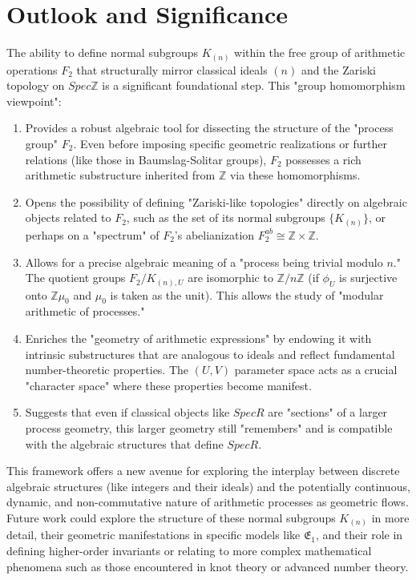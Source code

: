 \documentclass{article}[a4paper,12pt]
\begin{document}
\section{Outlook and Significance}
\label{sec:outlook}

The ability to define normal subgroups $K_{(n)}$ within the free group of arithmetic operations $F_2$ that structurally mirror classical ideals $(n)$ and the Zariski topology on $Spec \mathbb{Z}$ is a significant foundational step. This "group homomorphism viewpoint":

\begin{enumerate}
    \item Provides a robust algebraic tool for dissecting the structure of the "process group" $F_2$. Even before imposing specific geometric realizations or further relations (like those in Baumslag-Solitar groups), $F_2$ possesses a rich arithmetic substructure inherited from $\mathbb{Z}$ via these homomorphisms.
    \item Opens the possibility of defining "Zariski-like topologies" directly on algebraic objects related to $F_2$, such as the set of its normal subgroups $\{K_{(n)}\}$, or perhaps on a "spectrum" of $F_2$'s abelianization $F_2^{ab} \cong \mathbb{Z} \times \mathbb{Z}$.
    \item Allows for a precise algebraic meaning of a "process being trivial modulo $n$." The quotient groups $F_2/K_{(n),U}$ are isomorphic to $\mathbb{Z}/n\mathbb{Z}$ (if $\phi_U$ is surjective onto $\mathbb{Z}\mu_0$ and $\mu_0$ is taken as the unit). This allows the study of "modular arithmetic of processes."
    \item Enriches the "geometry of arithmetic expressions" by endowing it with intrinsic substructures that are analogous to ideals and reflect fundamental number-theoretic properties. The $(U,V)$ parameter space acts as a crucial "character space" where these properties become manifest.
    \item Suggests that even if classical objects like $Spec R$ are "sections" of a larger process geometry, this larger geometry still "remembers" and is compatible with the algebraic structures that define $Spec R$.
\end{enumerate}

This framework offers a new avenue for exploring the interplay between discrete algebraic structures (like integers and their ideals) and the potentially continuous, dynamic, and non-commutative nature of arithmetic processes as geometric flows. Future work could explore the structure of these normal subgroups $K_{(n)}$ in more detail, their geometric manifestations in specific models like $\mathfrak{E}_1$, and their role in defining higher-order invariants or relating to more complex mathematical phenomena such as those encountered in knot theory or advanced number theory.
\end{document}
